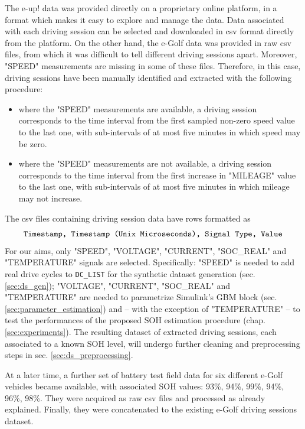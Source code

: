 The e-up! data was provided directly on a proprietary online platform, in a format which makes it easy to explore and manage the data. Data associated with each driving session can be selected and downloaded in csv format directly from the platform. On the other hand, the e-Golf data was provided in raw csv files, from which it was difficult to tell different driving sessions apart. Moreover, "SPEED" measurements are missing in some of these files. Therefore, in this case, driving sessions have been manually identified and extracted with the following procedure:
\begin{itemize}
    \item where the "SPEED" measurements are available, a driving session corresponds to the time interval from the first sampled non-zero speed value to the last one, with sub-intervals of at most five minutes in which speed may be zero.
    \item where the "SPEED" measurements are not available, a driving session corresponds to the time interval from the first increase in "MILEAGE" value to the last one, with sub-intervals of at most five minutes in which mileage may not increase.
\end{itemize}

\noindent The csv files containing driving session data have rows formatted as
\[
\text{\texttt{Timestamp, Timestamp (Unix Microseconds), Signal Type, Value}}
\]
For our aims, only "SPEED", "VOLTAGE", "CURRENT", "SOC\_REAL" and "TEMPERATURE" signals are selected. Specifically: "SPEED" is needed to add real drive cycles to \texttt{DC\_LIST} for the synthetic dataset generation (sec. \ref{sec:ds_gen}); "VOLTAGE", "CURRENT", "SOC\_REAL" and "TEMPERATURE" are needed to parametrize Simulink's GBM block (sec. \ref{sec:parameter_estimation}) and -- with the exception of "TEMPERATURE" -- to test the performances of the proposed SOH estimation procedure (chap. \ref{sec:experiments}). The resulting dataset of extracted driving sessions, each associated to a known SOH level, will undergo further cleaning and preprocessing steps in sec. \ref{sec:ds_preprocessing}.

At a later time, a further set of battery test field data for six different e-Golf vehicles became available, with associated SOH values: 93\%, 94\%, 99\%, 94\%, 96\%, 98\%. They were acquired as raw csv files and processed as already explained. Finally, they were concatenated to the existing e-Golf driving sessions dataset.